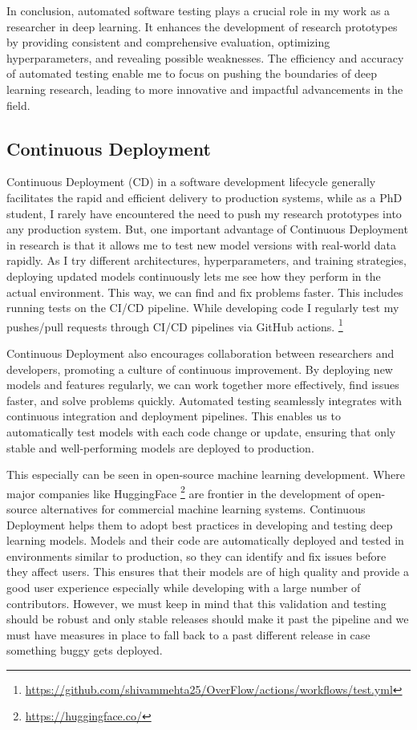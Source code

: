 \documentclass[11pt]{article}
\begin{document}
In conclusion, automated software testing plays a crucial role in my work as a researcher in deep learning. It enhances the development of research prototypes by providing consistent and comprehensive evaluation, optimizing hyperparameters, and revealing possible weaknesses. The efficiency and accuracy of automated testing enable me to focus on pushing the boundaries of deep learning research, leading to more innovative and impactful advancements in the field.

\subsection*{Continuous Deployment}
Continuous Deployment (CD) in a software development lifecycle generally facilitates the rapid and efficient delivery to production systems, while as a PhD student, I rarely have encountered the need to push my research prototypes into any production system. But, one important advantage of Continuous Deployment in research is that it allows me to test new model versions with real-world data rapidly. As I try different architectures, hyperparameters, and training strategies, deploying updated models continuously lets me see how they perform in the actual environment. This way, we can find and fix problems faster. This includes running tests on the CI/CD pipeline. While developing code I regularly test my pushes/pull requests through CI/CD pipelines via GitHub actions. \footnote{\url{https://github.com/shivammehta25/OverFlow/actions/workflows/test.yml}}

Continuous Deployment also encourages collaboration between researchers and developers, promoting a culture of continuous improvement. By deploying new models and features regularly, we can work together more effectively, find issues faster, and solve problems quickly. Automated testing seamlessly integrates with continuous integration and deployment pipelines. This enables us to automatically test models with each code change or update, ensuring that only stable and well-performing models are deployed to production.

This especially can be seen in open-source machine learning development. Where major companies like HuggingFace \footnote{\url{https://huggingface.co/}} are frontier in the development of open-source alternatives for commercial machine learning systems. Continuous Deployment helps them to adopt best practices in developing and testing deep learning models. Models and their code are automatically deployed and tested in environments similar to production, so they can identify and fix issues before they affect users. This ensures that their models are of high quality and provide a good user experience \cite{renggli2019continuous} especially while developing with a large number of contributors. However, we must keep in mind that this validation and testing should be robust and only stable releases should make it past the pipeline and we must have measures in place to fall back to a past different release in case something buggy gets deployed. 
\end{document}
